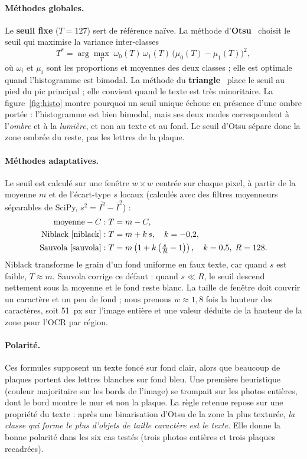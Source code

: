 \documentclass[11pt,a4paper]{article}
\begin{document}
\paragraph{Méthodes globales.} Le \textbf{seuil fixe} ($T=127$) sert de référence naïve. La méthode d'\textbf{Otsu}~\cite{otsu} choisit le seuil qui maximise la variance inter-classes
\[ T^\ast = \arg\max_T\; \omega_0(T)\,\omega_1(T)\,\bigl(\mu_0(T)-\mu_1(T)\bigr)^2, \]
où $\omega_i$ et $\mu_i$ sont les proportions et moyennes des deux classes ; elle est optimale quand l'histogramme est bimodal. La méthode du \textbf{triangle}~\cite{triangle} place le seuil au pied du pic principal ; elle convient quand le texte est très minoritaire. La figure~\ref{fig:histo} montre pourquoi un seuil unique échoue en présence d'une ombre portée : l'histogramme est bien bimodal, mais ses deux modes correspondent à l'\emph{ombre} et à la \emph{lumière}, et non au texte et au fond. Le seuil d'Otsu sépare donc la zone ombrée du reste, pas les lettres de la plaque.

\paragraph{Méthodes adaptatives.} Le seuil est calculé sur une fenêtre $w\times w$ centrée sur chaque pixel, à partir de la moyenne $m$ et de l'écart-type $s$ locaux (calculés avec des filtres moyenneurs séparables de SciPy, $s^2 = \overline{I^2} - \bar I^2$) :
\begin{align*}
\text{moyenne} - C &: T = m - C, \\
\text{Niblack~\cite{niblack}} &: T = m + k\,s,\quad k=-0{,}2, \\
\text{Sauvola~\cite{sauvola}} &: T = m\left(1 + k\left(\tfrac{s}{R}-1\right)\right),\quad k=0{,}5,\; R=128.
\end{align*}
Niblack transforme le grain d'un fond uniforme en faux texte, car quand $s$ est faible, $T \approx m$. Sauvola corrige ce défaut : quand $s \ll R$, le seuil descend nettement sous la moyenne et le fond reste blanc. La taille de fenêtre doit couvrir un caractère et un peu de fond ; nous prenons $w \approx 1{,}8$ fois la hauteur des caractères, soit 51~px sur l'image entière et une valeur déduite de la hauteur de la zone pour l'OCR par région.

\paragraph{Polarité.} Ces formules supposent un texte foncé sur fond clair, alors que beaucoup de plaques portent des lettres blanches sur fond bleu. Une première heuristique (couleur majoritaire sur les bords de l'image) se trompait sur les photos entières, dont le bord montre le mur et non la plaque. La règle retenue repose sur une propriété du texte : après une binarisation d'Otsu de la zone la plus texturée, \emph{la classe qui forme le plus d'objets de taille \og caractère\fg{} est le texte}. Elle donne la bonne polarité dans les six cas testés (trois photos entières et trois plaques recadrées).
\end{document}
